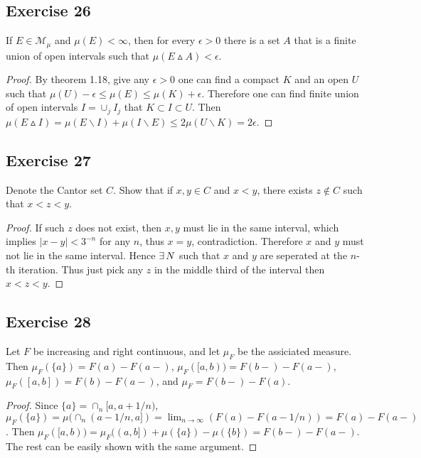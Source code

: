 \subsection*{Exercise 26}
If $E\in\mathcal{M}_\mu$ and $\mu(E)<\infty$, then for every $\epsilon>0$ there is a set $A$ that is a finite union of open intervals such that $\mu(E\vartriangle A)<\epsilon$.
\begin{proof}
    By theorem 1.18, give any $\epsilon>0$ one can find a compact $K$ and an open $U$ such that $\mu(U)-\epsilon\le\mu(E)\le\mu(K)+\epsilon$. Therefore one can find finite union of open intervals $I=\cup_j I_j$ that $K\subset I\subset U$. Then $\mu(E\vartriangle I)=\mu(E\backslash I)+\mu(I\backslash E)\le 2\mu(U\backslash K)=2\epsilon$. 
\end{proof}
\subsection*{Exercise 27}
Denote the Cantor set $C$. Show that if $x,y\in C$ and $x<y$, there exists $z\not\in C$ such that $x<z<y$.
\begin{proof}
    If such $z$ does not exist, then $x,y$ must lie in the same interval, which implies $|x-y|<3^{-n}$ for any $n$, thus $x=y$, contradiction. Therefore $x$ and $y$ must not lie in the same interval. Hence $\exists\, N$ such that $x$ and $y$ are seperated at the $n$-th iteration. Thus just pick any $z$ in the middle third of the interval then $x<z<y$.  
\end{proof}
\subsection*{Exercise 28}
Let $F$ be increasing and right continuous, and let $\mu_F$ be the assiciated measure. Then $\mu_F(\{a\})=F(a)-F(a-)$, $\mu_F([a,b))=F(b-)-F(a-)$, $\mu_F([a,b])=F(b)-F(a-)$, and $\mu_F=F(b-)-F(a)$.
\begin{proof}
    Since $\{a\}=\cap_n[a,a+1/n)$, $\mu_F(\{a\})=\mu(\cap_n(a-1/n,a])=\lim_{n\to\infty}(F(a)-F(a-1/n))=F(a)-F(a-)$. Then $\mu_F([a,b))=\mu_F((a,b])+\mu(\{a\})-\mu(\{b\})=F(b-)-F(a-)$. The rest can be easily shown with the same argument.
\end{proof}
